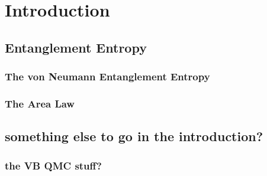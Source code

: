 \chapter{Introduction}
\section{Entanglement Entropy}
\subsection{The von Neumann Entanglement Entropy}
\subsection{The Area Law}
\section{something else to go in the introduction?}
\subsection{the VB QMC stuff?}